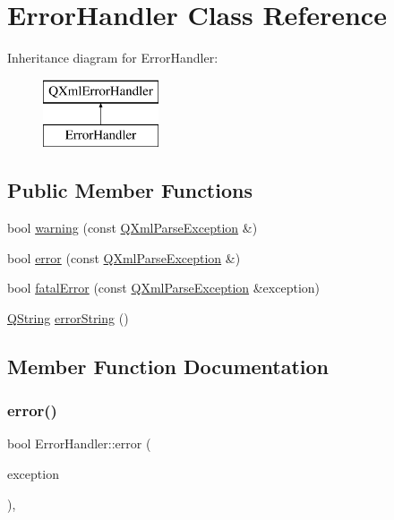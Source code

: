 \hypertarget{class_error_handler}{}\section{Error\+Handler Class Reference}
\label{class_error_handler}
Inheritance diagram for Error\+Handler\+:\begin{figure}[H]
\begin{center}
\leavevmode
\includegraphics[height=2.000000cm]{class_error_handler}
\end{center}
\end{figure}
\subsection*{Public Member Functions}
\begin{DoxyCompactItemize}
\item 
bool \mbox{\hyperlink{class_error_handler_abb147190a3d48dae251d7db795d9e28d}{warning}} (const \mbox{\hyperlink{class_q_xml_parse_exception}{Q\+Xml\+Parse\+Exception}} \&)
\item 
bool \mbox{\hyperlink{class_error_handler_a691ab0beb4cd9ba9fbc82b850ad533a3}{error}} (const \mbox{\hyperlink{class_q_xml_parse_exception}{Q\+Xml\+Parse\+Exception}} \&)
\item 
bool \mbox{\hyperlink{class_error_handler_abb20bb96f3b3b743e1d5649d6c6be5a0}{fatal\+Error}} (const \mbox{\hyperlink{class_q_xml_parse_exception}{Q\+Xml\+Parse\+Exception}} \&exception)
\item 
\mbox{\hyperlink{class_q_string}{Q\+String}} \mbox{\hyperlink{class_error_handler_a193381152001d019c4155600a61c478d}{error\+String}} ()
\end{DoxyCompactItemize}


\subsection{Member Function Documentation}
\mbox{\label{class_error_handler_a691ab0beb4cd9ba9fbc82b850ad533a3}} 
\subsubsection{\texorpdfstring{error()}{error()}}
{\footnotesize\ttfamily bool Error\+Handler\+::error (\begin{DoxyParamCaption}\item[{const \mbox{\hyperlink{class_q_xml_parse_exception}{Q\+Xml\+Parse\+Exception}} \&}]{exception }\end{DoxyParamCaption})\hspace{0.3cm}{\ttfamily [inline]}, {\ttfamily [virtual]}}

